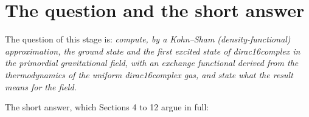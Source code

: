 \documentclass[11pt]{article}
\begin{document}
\begin{abstract}
erratum E4.1, $mS=-36H^2/\kappa$ and $\lambda S^2=30H^2/\kappa$, are met in no run: they would need couplings $10^3$ to $10^4$ times the largest used. All 125 exact Wolfram checks, all 157 independent sympy checks, all 397 self-checks of the Rust program and all 94 checks of the Mathematica notebook pass; a repeated Rust run is byte-identical in 330 files and a run with tighter tolerances agrees to $5.96\times10^{-8}$. The run-by-run cross-check against the reference solver (python-check-report.json) was being regenerated when this edition was written; Section 13.4 states exactly what it contains and what is pending.

\end{abstract}

\section{The question and the short answer}

The question of this stage is: \emph{compute, by a Kohn--Sham (density-functional) approximation, the ground state and the first excited state of dirac16complex in the primordial gravitational field, with an exchange functional derived from the thermodynamics of the uniform dirac16complex gas, and state what the result means for the field.}

The short answer, which Sections 4 to 12 argue in full:
\end{document}
